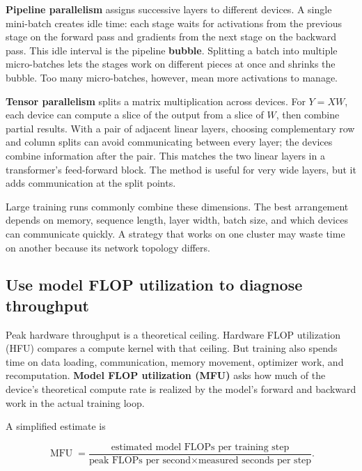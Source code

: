\textbf{Pipeline parallelism} assigns successive layers to different devices. A single mini-batch creates idle time: each stage waits for activations from the previous stage on the forward pass and gradients from the next stage on the backward pass. This idle interval is the pipeline \textbf{bubble}. Splitting a batch into multiple micro-batches lets the stages work on different pieces at once and shrinks the bubble. Too many micro-batches, however, mean more activations to manage.

\textbf{Tensor parallelism} splits a matrix multiplication across devices. For \(Y=XW\), each device can compute a slice of the output from a slice of \(W\), then combine partial results. With a pair of adjacent linear layers, choosing complementary row and column splits can avoid communicating between every layer; the devices combine information after the pair. This matches the two linear layers in a transformer's feed-forward block. The method is useful for very wide layers, but it adds communication at the split points.

Large training runs commonly combine these dimensions. The best arrangement depends on memory, sequence length, layer width, batch size, and which devices can communicate quickly. A strategy that works on one cluster may waste time on another because its network topology differs.

\subsection{Use model FLOP utilization to diagnose throughput}\label{04-visual-computing-ii-ch031-use-model-flop-utilization-to-diagnose-throughput}

\hypertarget{04-visual-computing-ii-ch031-use-model-flop-utilization-to-diagnose-throughput}{}

Peak hardware throughput is a theoretical ceiling. Hardware FLOP utilization (HFU) compares a compute kernel with that ceiling. But training also spends time on data loading, communication, memory movement, optimizer work, and recomputation. \textbf{Model FLOP utilization (MFU)} asks how much of the device's theoretical compute rate is realized by the model's forward and backward work in the actual training loop.

A simplified estimate is

\[
\operatorname{MFU}=\frac{\text{estimated model FLOPs per training step}}
{\text{peak FLOPs per second}\times\text{measured seconds per step}}.
\]

